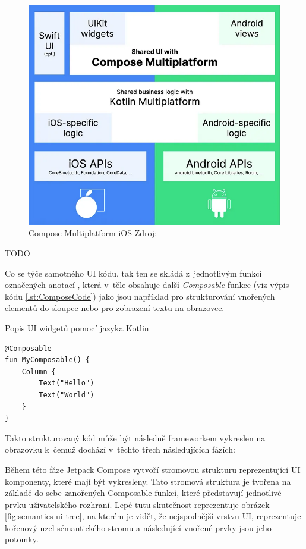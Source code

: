 \begin{figure}[H]
  \centering
  \includegraphics[width=.7\textwidth]{composeIOS.png}
  \caption{Compose Multiplatform iOS Zdroj: \cite{imgComposeMultiplatfromiOS}}
  \label{fig:composeIOS}
\end{figure}

TODO %

Co se týče samotného UI kódu, tak ten se skládá z~jednotlivým funkcí označených anotací , která v~těle obsahuje další
\textit{Composable} funkce (viz výpis kódu \ref{lst:ComposeCode}) jako jsou například  pro strukturování vnořených elementů do sloupce nebo  pro zobrazení
textu na obrazovce. 

\begin{listing}[H]
\caption{Popis UI widgetů pomocí jazyka Kotlin}\label{lst:ComposeCode}
\begin{verbatim}
@Composable
fun MyComposable() {
    Column {
        Text("Hello")
        Text("World")
    }
}
\end{verbatim}
\end{listing}

Takto strukturovaný kód může být následně frameworkem vykreslen na obrazovku k~čemuž dochází v~těchto třech následujících fázích:

Během této fáze Jetpack Compose vytvoří stromovou strukturu reprezentující UI komponenty, které mají být vykresleny.\cite{jetpackPhases} 
Tato stromová struktura je tvořena na základě do sebe zanořených Composable funkcí, které představují jednotlivé prvku uživatelského rozhraní.
Lepé tutu skutečnost reprezentuje obrázek \ref{fig:semantics-ui-tree}, na kterém je vidět, že nejspodnější vrstvu UI, reprezentuje kořenový uzel
sémantického stromu a následující vnořené prvky jsou jeho potomky.

